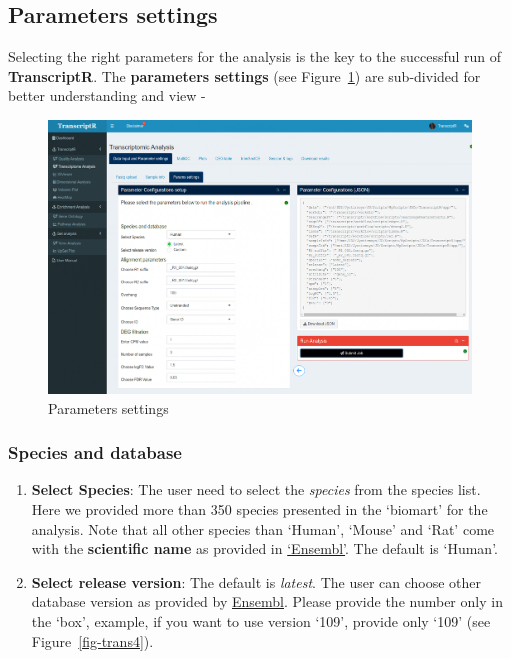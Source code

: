 \documentclass[
  a4paper,
  oneside,
  open=any]{scrreport}
\providecommand{\tightlist}{%
  \setlength{\itemsep}{0pt}\setlength{\parskip}{0pt}}\usepackage{longtable,booktabs,array}
\begin{document}
\hypertarget{parameters-settings}{%
\subsection{Parameters settings}\label{parameters-settings}}

Selecting the right parameters for the analysis is the key to the
successful run of \textbf{TranscriptR}. The \textbf{parameters settings}
(see Figure~\ref{fig-trans3}) are sub-divided for better understanding
and view -

\begin{figure}[H]

{\centering \includegraphics{./_images/transcriptome/transcriptr4.png}

}

\caption{\label{fig-trans3}Parameters settings}

\end{figure}

\hypertarget{species-and-database}{%
\subsubsection{Species and database}\label{species-and-database}}

\begin{enumerate}
\def\labelenumi{\arabic{enumi}.}
\tightlist
\item
  \textbf{Select Species}: The user need to select the \emph{species}
  from the species list. Here we provided more than 350 species
  presented in the `biomart' for the analysis. Note that all other
  species than `Human', `Mouse' and `Rat' come with the
  \textbf{scientific name} as provided in
  \href{http://www.ensembl.org/info/about/species.html}{`Ensembl'}. The
  default is `Human'.
\item
  \textbf{Select release version}: The default is \emph{latest}. The
  user can choose other database version as provided by
  \href{https://ftp.ensembl.org/pub/}{Ensembl}. Please provide the
  number only in the `box', example, if you want to use version `109',
  provide only `109' (see Figure~\ref{fig-trans4}).
\end{enumerate}
\end{document}
